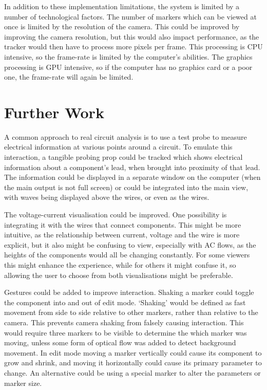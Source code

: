 In addition to these implementation limitations, the system is limited by a number of technological factors. The number of markers which can be viewed at once is limited by the resolution of the camera. This could be improved by improving the camera resolution, but this would also impact performance, as the tracker would then have to process more pixels per frame. This processing is CPU intensive, so the frame-rate is limited by the computer's abilities. The graphics processing is GPU intensive, so if the computer has no graphics card or a poor one, the frame-rate will again be limited.

\section{Further Work}

A common approach to real circuit analysis is to use a test probe to measure electrical information at various points around a circuit. To emulate this interaction, a tangible probing prop could be tracked which shows electrical information about a component's lead, when brought into proximity of that lead. The information could be displayed in a separate window on the computer (when the main output is not full screen) or could be integrated into the main view, with waves being displayed above the wires, or even as the wires.

The voltage-current visualisation could be improved. One possibility is integrating it with the wires that connect components. This might be more intuitive, as the relationship between current, voltage and the wire is more explicit, but it also might be confusing to view, especially with AC flows, as the heights of the components would all be changing constantly. For some viewers this might enhance the experience, while for others it might confuse it, so allowing the user to choose from both visualisations might be preferable.

Gestures could be added to improve interaction. Shaking a marker could toggle the component into and out of edit mode. `Shaking' would be defined as fast movement from side to side relative to other markers, rather than relative to the camera. This prevents camera shaking from falsely causing interaction. This would require three markers to be visible to determine the which marker was moving, unless some form of optical flow was added to detect background movement. In edit mode moving a marker vertically could cause its component to grow and shrink, and moving it horizontally could cause its primary parameter to change. An alternative could be using a special marker to alter the parameters or marker size.

